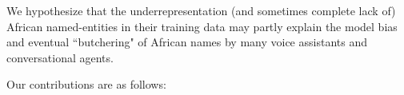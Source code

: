 \documentclass{INTERSPEECH2023}
\begin{document}


We hypothesize that the underrepresentation (and sometimes complete lack of) African named-entities in their training data may partly explain the model bias and eventual ``butchering" of African names by many voice assistants and conversational agents. %


Our contributions are as follows:



\end{document}

